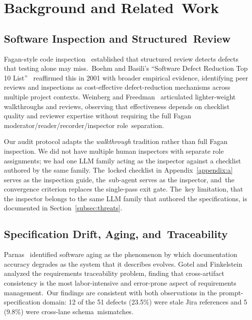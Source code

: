 \documentclass[software,article,accept,pdftex,oneauthor]{Definitions/mdpi}
\def\hl#1{#1}
\begin{document}
\section{Background and Related~Work}
\label{sec:background}
\unskip

\subsection{Software Inspection and Structured~Review}

Fagan-style code inspection~\cite{fagan1976design} established that structured review detects defects that testing alone may miss.~Boehm and Basili's ``Software Defect Reduction Top 10 List''~\cite{boehm2001defect} reaffirmed this in 2001 with broader empirical evidence, identifying peer reviews and inspections as cost-effective defect-reduction mechanisms across multiple project contexts. Weinberg and Freedman~\cite{weinberg1984reviews} articulated lighter-weight walkthroughs and reviews, observing that effectiveness depends on checklist quality and reviewer expertise without requiring the full Fagan moderator/reader/recorder/inspector role~separation.

Our audit protocol adapts the \emph{\hl{walkthrough}} tradition rather than full Fagan inspection. We did not have multiple human inspectors with separate role assignments; we had one LLM family acting as the inspector against a checklist authored by the same family. The~locked checklist in Appendix~\ref{appendix:a} serves as the inspection guide, the~sub-agent serves as the inspector, and~the convergence criterion replaces the single-pass exit gate. The~key limitation, that the inspector belongs to the same LLM family that authored the specifications, is documented in Section~\ref{subsec:threats}.

\subsection{Specification Drift, Aging, and~Traceability}

Parnas~\cite{parnas1994software} identified software aging as the phenomenon by which documentation accuracy degrades as the system that it describes evolves. Gotel and Finkelstein~\cite{gotel1994analysis} analyzed the requirements traceability problem, finding that cross-artifact consistency is the most labor-intensive and error-prone aspect of requirements management.~Our findings are consistent with both observations in the prompt-specification domain: 12 of the 51 defects (23.5\%) were stale Jira references and 5 (9.8\%) were cross-lane schema~mismatches.
\end{document}
